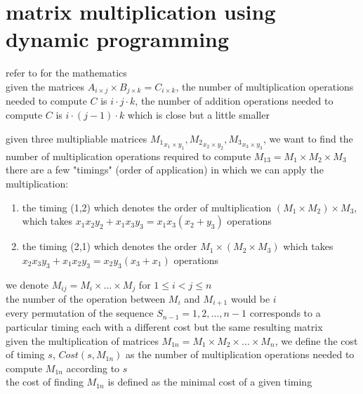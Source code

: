 \documentclass[a4paper,12pt]{article}
\begin{document}
\section{matrix multiplication using dynamic programming}
\label{sec:org04c4883}
refer to for the mathematics\\[0pt]
given the matrices \(A_{i \times j} \times B_{j \times k} = C_{i \times k}\), the number of multiplication operations needed to compute \(C\) is \(i \cdot j \cdot k\), the number of addition operations needed to compute \(C\) is \(i \cdot (j-1) \cdot k\) which is close but a little smaller\\[0pt]
\begin{my_example}
given three multipliable matrices \({M_1}_{x_1 \times y_1},{M_2}_{x_2 \times y_2},{M_3}_{x_3 \times y_3}\), we want to find the number of multiplication operations required to compute \(M_{13}=M_1 \times M_2 \times M_3\)\\[0pt]
there are a few "timings" (order of application) in which we can apply the multiplication:\\[0pt]
\begin{enumerate}
\item the timing (1,2) which denotes the order of multiplication \((M_1 \times M_2) \times M_3\), which takes \(x_1x_2y_2+x_1x_3y_3=x_1x_3(x_2+y_3)\) operations\\[0pt]
\item the timing (2,1) which denotes the order \(M_1 \times (M_2 \times M_3)\) which takes \(x_2x_3y_3+x_1x_2y_3=x_2y_3(x_3+x_1)\) operations\\[0pt]
\end{enumerate}
\end{my_example}
we denote \(M_{ij} = M_i \times \dots \times M_j\) for \(1 \le i < j \le n\)\\[0pt]
the number of the operation between \(M_i\) and \(M_{i+1}\) would be \(i\)\\[0pt]
every permutation of the sequence \(S_{n-1}=1,2,\dots,n-1\) corresponds to a particular timing each with a different cost but the same resulting matrix\\[0pt]
given the multiplication of matrices \(M_{1n} = M_1 \times M_2 \times \dots \times M_n\), we define the cost of timing \(s\), \(Cost(s,M_{1n})\) as the number of multiplication operations needed to compute \(M_{1n}\) according to \(s\)\\[0pt]
the cost of finding \(M_{1n}\) is defined as the minimal cost of a given timing\\[0pt]
\end{document}
